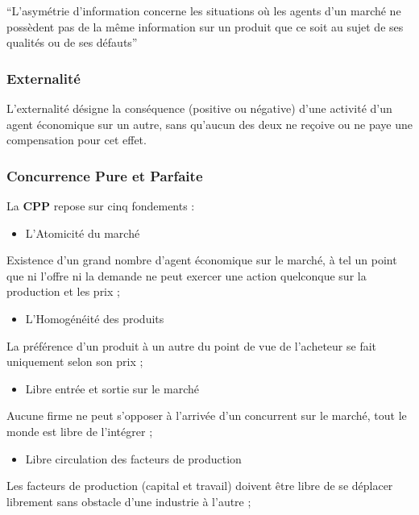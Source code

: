 \documentclass[
  letterpaper,
  DIV=11,
  numbers=noendperiod]{scrartcl}
\providecommand{\tightlist}{%
  \setlength{\itemsep}{0pt}\setlength{\parskip}{0pt}}\usepackage{longtable,booktabs,array}
\begin{document}
``L'asymétrie d'information concerne les situations où les agents d'un
marché ne possèdent pas de la même information sur un produit que ce
soit au sujet de ses qualités ou de ses défauts''

\subsubsection{Externalité}\label{externalituxe9}

L'externalité désigne la conséquence (positive ou négative) d'une
activité d'un agent économique sur un autre, sans qu'aucun des deux ne
reçoive ou ne paye une compensation pour cet effet.

\subsubsection{Concurrence Pure et
Parfaite}\label{concurrence-pure-et-parfaite}

La \textbf{CPP} repose sur cinq fondements :

\begin{itemize}
\tightlist
\item
  L'Atomicité du marché
\end{itemize}

Existence d'un grand nombre d'agent économique sur le marché, à tel un
point que ni l'offre ni la demande ne peut exercer une action quelconque
sur la production et les prix ;

\begin{itemize}
\tightlist
\item
  L'Homogénéité des produits
\end{itemize}

La préférence d'un produit à un autre du point de vue de l'acheteur se
fait uniquement selon son prix ;

\begin{itemize}
\tightlist
\item
  Libre entrée et sortie sur le marché
\end{itemize}

Aucune firme ne peut s'opposer à l'arrivée d'un concurrent sur le
marché, tout le monde est libre de l'intégrer ;

\begin{itemize}
\tightlist
\item
  Libre circulation des facteurs de production
\end{itemize}

Les facteurs de production (capital et travail) doivent être libre de se
déplacer librement sans obstacle d'une industrie à l'autre ;
\end{document}
